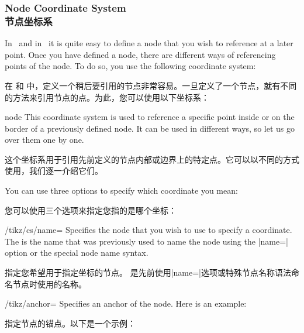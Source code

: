\subsubsection{Node Coordinate System\\节点坐标系}
\label{section-node-coordinates}

In \pgfname\ and in \tikzname\ it is quite easy to define a node that you wish
to reference at a later point. Once you have defined a node, there are
different ways of referencing points of the node. To do so, you use the
following coordinate system:

在 \pgfname 和 \tikzname 中，定义一个稍后要引用的节点非常容易。一旦定义了一个节点，就有不同的方法来引用节点的点。为此，您可以使用以下坐标系：

\begin{coordinatesystem}{node}
    This coordinate system is used to reference a specific point inside or on
    the border of a previously defined node. It can be used in different ways,
    so let us go over them one by one.

    这个坐标系用于引用先前定义的节点内部或边界上的特定点。它可以以不同的方式使用，我们逐一介绍它们。


    You can use three options to specify which coordinate you mean:
    
    您可以使用三个选项来指定您指的是哪个坐标：
%
    \begin{key}{/tikz/cs/name=}
        Specifies the node that you wish to use to specify a coordinate. The
         is the name that was previously used to name the node
        using the |name=| option or the special node name
        syntax.

        指定您希望用于指定坐标的节点。 是先前使用|name=|选项或特殊节点名称语法命名节点时使用的名称。

    \end{key}
    \begin{key}{/tikz/anchor=}
        Specifies an anchor of the node. Here is an example:

        指定节点的锚点。以下是一个示例：

\begin{codeexample}[preamble={\usetikzlibrary{arrows.meta}}]
\end{codeexample}
\end{key}
\end{coordinatesystem}
